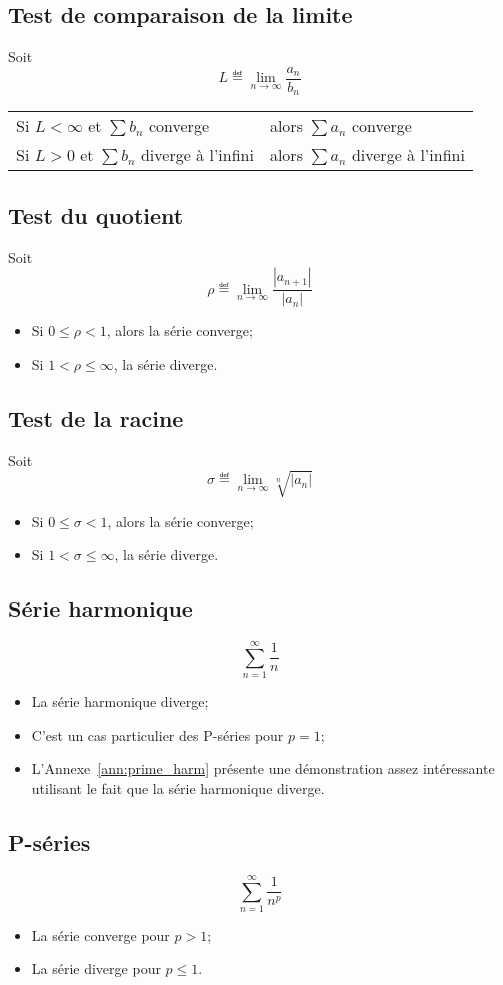 \subsection{Test de comparaison de la limite}
Soit
\[ L \eqdef \lim_{n \to \infty} \frac{a_n}{b_n} \]
\begin{tabular}{ll}
  Si $L < \infty$ et $\sum b_n$ converge &
  alors $\sum a_n$ converge\\
  Si $L > 0$ et $\sum b_n$ diverge à l'infini &
  alors $\sum a_n$ diverge à l'infini
\end{tabular}

\subsection{Test du quotient}
Soit
\[ \rho \eqdef \lim_{n \to \infty} \frac{|a_{n+1}|}{|a_n|} \]
\begin{itemize}
  \item Si $0 \leq \rho < 1$, alors la série converge;
  \item Si $1 < \rho \leq \infty$, la série diverge.
\end{itemize}

\subsection{Test de la racine}
Soit
\[ \sigma \eqdef \lim_{n \to \infty} \sqrt[n]{|a_n|} \]
\begin{itemize}
  \item Si $0 \leq \sigma < 1$, alors la série converge;
  \item Si $1 < \sigma \leq \infty$, la série diverge.
\end{itemize}

\subsection{Série harmonique}
\[ \sum_{n = 1}^{\infty} \frac{1}{n} \]
\begin{itemize}
  \item La série harmonique diverge;
  \item C'est un cas particulier des P-séries pour $p = 1$;
  \item L'Annexe~\ref{ann:prime_harm} présente
    une démonstration assez intéressante utilisant
    le fait que la série harmonique diverge.
\end{itemize}

\subsection{P-séries}
\[ \sum_{n = 1}^{\infty} \frac{1}{n^p} \]
\begin{itemize}
  \item La série converge pour $p > 1$;
  \item La série diverge pour $p \leq 1$.
\end{itemize}

